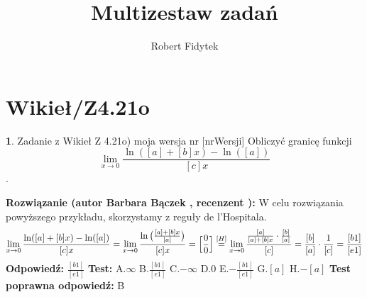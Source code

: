 \documentclass[12pt, a4paper]{article}
\title{Multizestaw zadań}
\author{Robert Fidytek}
\date{}
\theoremstyle{definition} %
\newtheorem{zad}{}
\newcommand{\kategoria}[1]{\section{#1}} %
\newcommand{\zadStart}[1]{\begin{zad}#1\newline} %
\newcommand{\zadStop}{\end{zad}}   %
\newcommand{\rozwStart}[2]{\noindent \textbf{Rozwiązanie (autor #1 , recenzent #2): }\newline} %
\newcommand{\rozwStop}{\newline}                                            %
\newcommand{\odpStart}{\noindent \textbf{Odpowiedź:}\newline}    %
\newcommand{\odpStop}{\newline}                                             %
\newcommand{\testStart}{\noindent \textbf{Test:}\newline} %
\newcommand{\testStop}{\newline} %
\newcommand{\kluczStart}{\noindent \textbf{Test poprawna odpowiedź:}\newline} %
\newcommand{\kluczStop}{\newline} %
\begin{document}
\maketitle


\kategoria{Wikieł/Z4.21o}
\zadStart{Zadanie z Wikieł Z 4.21o) moja wersja nr [nrWersji]}
Obliczyć granicę funkcji $$ \lim_{x \rightarrow 0} \frac{\ln([a]+[b]x)-\ln([a])}{[c]x}$$.
\zadStop
\rozwStart{Barbara Bączek}{}
W celu rozwiązania powyższego przykładu, skorzystamy z reguły de l'Hospitala.
$$ \lim_{x \rightarrow 0} \frac{\ln([a]+[b]x)-\ln([a])}{[c]x}= \lim_{x \rightarrow 0} \frac{\ln \big{(}\frac{[a]+[b]x}{[a]}\big{)}}{[c]x}= \Big{[} \frac{0}{0}\Big{]} \stackrel{[H]}{=} \lim_{x \rightarrow 0} \frac{\frac{[a]}{[a]+[b]x} \cdot \frac{[b]}{[a]}}{[c]}= \frac{[b]}{[a]} \cdot \frac{1}{[c]}= \frac{[b1]}{[e1]} $$
\rozwStop
\odpStart
$\frac{[b1]}{[e1]}$
\odpStop
\testStart
A.$\infty$
B.$\frac{[b1]}{[e1]}$
C.$-\infty$
D.$0$
E.$-\frac{[b1]}{[e1]}$
G.$[a]$
H.$-[a]$
\testStop
\kluczStart
B
\kluczStop
\end{document}
